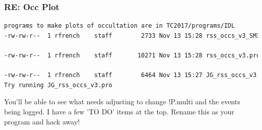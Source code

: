 \documentclass[crop=false,class=article,oneside]{standalone}
\begin{document}
\subsubsection{\footnotesize RE: Occ Plot}
\begin{lstlisting}[language=bash,basicstyle=\footnotesize]
programs to make plots of occultation are in TC2017/programs/IDL
-rw-rw-r--  1 rfrench    staff        2733 Nov 13 15:28 rss_occs_v3_SM3.ker

-rw-rw-r--  1 rfrench    staff       10271 Nov 13 15:28 rss_occs_v3.pro

-rw-rw-r--  1 rfrench    staff        6464 Nov 13 15:27 JG_rss_occs_v3.pro
Try running JG_rss_occs_v3.pro
\end{lstlisting}
You'll be able to see what needs adjusting to change !P.multi and the events being logged. I have a few 'TO DO' items at the top. Rename this as your program and hack away!
\end{document}
